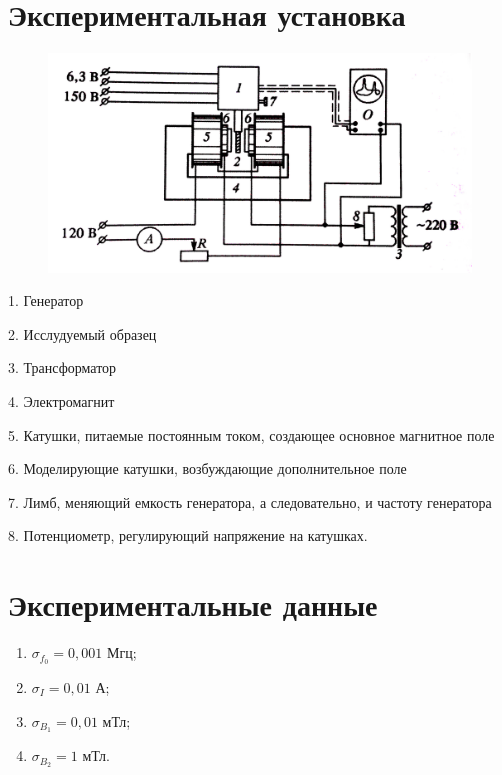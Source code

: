 \documentclass[a4paper,12pt]{article} %
\begin{document}
	\section{Экспериментальная установка}
	\begin{figure}[h!]
		\begin{floatrow}
			{\includegraphics[scale=0.2]{ustanovka}}    
		\end{floatrow}
	\end{figure}
	\par 1. Генератор
	\par 2. Исслудуемый образец
	\par 3. Трансформатор
	\par 4. Электромагнит
	\par 5. Катушки, питаемые постоянным током, создающее основное магнитное поле
	\par 6. Моделирующие катушки, возбуждающие дополнительное поле
	\par 7. Лимб, меняющий емкость генератора, а следовательно, и частоту генератора
	\par 8. Потенциометр, регулирующий напряжение на катушках.

	\newpage
	\section{Экспериментальные данные}
	\begin{enumerate}
		\item
			$\sigma_{f_0} = 0,001$ Мгц;
		\item
			$\sigma_I = 0,01$ А;
		\item
			$\sigma_{B_1}  = 0,01$ мТл;
		\item
			$\sigma_{B_2} = 1$ мТл.
	\end{enumerate}
	
\end{document}
